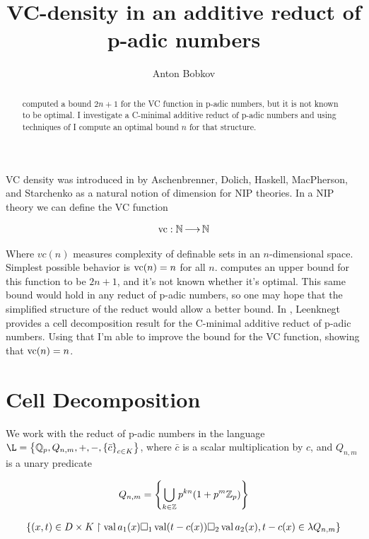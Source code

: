 \documentclass{amsart}
\title{VC-density in an additive reduct of p-adic numbers}
\author{Anton Bobkov}
\newcommand{\curly}[1]{\left\{#1\right\}}
\DeclareMathOperator{\val}{val}
\begin{document}
\begin{abstract}
	\cite{density} computed a bound $2n+1$ for the VC function in p-adic numbers, but it is not known to be optimal.
	I investigate a C-minimal additive reduct of p-adic numbers and using techniques of \cite{reduct} I compute an optimal bound $n$ for that structure.
\end{abstract}


\maketitle

VC density was introduced in \cite{density} by Aschenbrenner, Dolich, Haskell, MacPherson, and Starchenko as a natural notion of dimension for NIP theories.
In a NIP theory we can define the VC function

\begin{align*}
	\operatorname{vc} : \mathbb{N} \operatorname{\longrightarrow} \mathbb{N}
\end{align*}

Where $vc(n)$ measures complexity of definable sets in an $n$-dimensional space.
Simplest possible behavior is $\operatorname{vc}(n) = n$ for all $n$.
\cite{density} computes an upper bound for this function to be $2n+1$, and it's not known whether it's optimal.
This same bound would hold in any reduct of p-adic numbers, so one may hope that the simplified structure of the reduct would allow a better bound.
In \cite{reduct}, Leenknegt provides a cell decomposition result for the C-minimal additive reduct of p-adic numbers.
Using that I'm able to improve the bound for the VC function, showing that $\operatorname{vc}(n) = n$.

\section{Cell Decomposition}
We work with the reduct of p-adic numbers in the language $\L = \curly{\Q_p, Q_{n,m}, +, -, \curly{\bar c}_{c \in K} }$,
where $\bar c$ is a scalar multiplication by $c$, and $Q_{n,m}$ is a unary predicate

\begin{align*}
	Q_{n,m} = \curly{\bigcup_{k \in \Z} p^{kn} (1 + p^m\Z_p) }
\end{align*}



\begin{align*}
	\curly{(x, t) \in D \times K \midr \val a_1(x) \square_1 \val (t - c(x)) \square_2 \val a_2(x), t - c(x) \in \lambda Q_{n,m} }
\end{align*}
\end{document}
